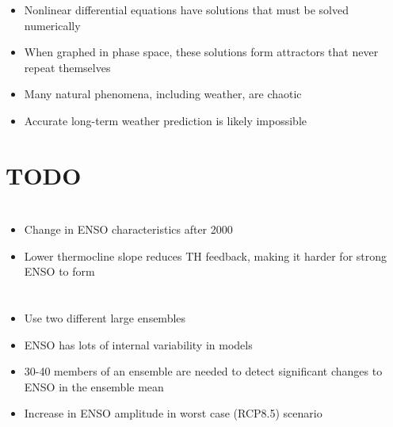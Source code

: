 \documentclass[11pt]{article}
\begin{document}
\begin{itemize}
\item Nonlinear differential equations have solutions that must be solved numerically
\item When graphed in phase space, these solutions form attractors that never repeat themselves
\item Many natural phenomena, including weather, are chaotic
\item Accurate long-term weather prediction is likely impossible
\end{itemize}

\section{{\bfseries\sffamily TODO} \cite{liu2007atmospheric}}
\label{sec:org771a8c8}

\section{\cite{lubbecke2014assessing}}
\label{sec:orgccacdfc}

\begin{itemize}
\item Change in ENSO characteristics after 2000
\item Lower thermocline slope reduces TH feedback, making it harder for strong ENSO to form
\end{itemize}

\section{\cite{maher2018enso}}
\label{sec:org8070eaf}

\begin{itemize}
\item Use two different large ensembles
\item ENSO has lots of internal variability in models
\item 30-40 members of an ensemble are needed to detect significant changes to ENSO in the ensemble mean
\item Increase in ENSO amplitude in worst case (RCP8.5) scenario
\end{itemize}

\section{\cite{nowack2017role}}
\label{sec:org123f132}
\end{document}
